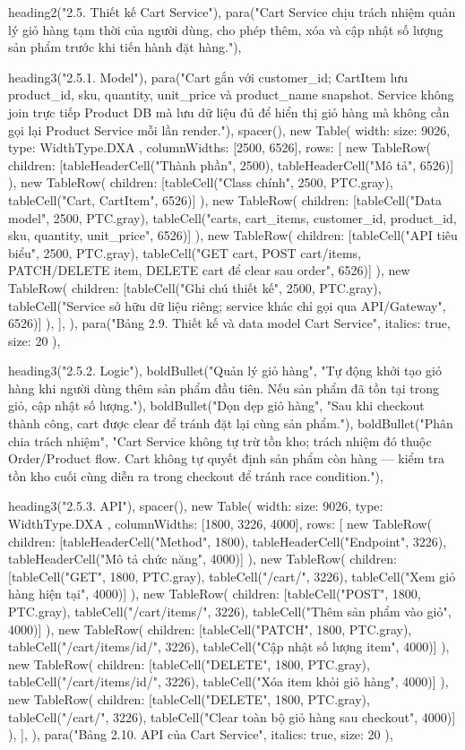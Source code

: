   heading2("2.5. Thiết kế Cart Service"),
  para("Cart Service chịu trách nhiệm quản lý giỏ hàng tạm thời của người dùng, cho phép thêm, xóa và cập nhật số lượng sản phẩm trước khi tiến hành đặt hàng."),

  heading3("2.5.1. Model"),
  para("Cart gắn với customer_id; CartItem lưu product_id, sku, quantity, unit_price và product_name snapshot. Service không join trực tiếp Product DB mà lưu dữ liệu đủ để hiển thị giỏ hàng mà không cần gọi lại Product Service mỗi lần render."),
  spacer(),
  new Table({
    width: { size: 9026, type: WidthType.DXA },
    columnWidths: [2500, 6526],
    rows: [
      new TableRow({ children: [tableHeaderCell("Thành phần", 2500), tableHeaderCell("Mô tả", 6526)] }),
      new TableRow({ children: [tableCell("Class chính", 2500, PTC.gray), tableCell("Cart, CartItem", 6526)] }),
      new TableRow({ children: [tableCell("Data model", 2500, PTC.gray), tableCell("carts, cart_items, customer_id, product_id, sku, quantity, unit_price", 6526)] }),
      new TableRow({ children: [tableCell("API tiêu biểu", 2500, PTC.gray), tableCell("GET cart, POST cart/items, PATCH/DELETE item, DELETE cart để clear sau order", 6526)] }),
      new TableRow({ children: [tableCell("Ghi chú thiết kế", 2500, PTC.gray), tableCell("Service sở hữu dữ liệu riêng; service khác chỉ gọi qua API/Gateway", 6526)] }),
    ],
  }),
  para("Bảng 2.9. Thiết kế và data model Cart Service", { italics: true, size: 20 }),

  heading3("2.5.2. Logic"),
  boldBullet("Quản lý giỏ hàng", "Tự động khởi tạo giỏ hàng khi người dùng thêm sản phẩm đầu tiên. Nếu sản phẩm đã tồn tại trong giỏ, cập nhật số lượng."),
  boldBullet("Dọn dẹp giỏ hàng", "Sau khi checkout thành công, cart được clear để tránh đặt lại cùng sản phẩm."),
  boldBullet("Phân chia trách nhiệm", "Cart Service không tự trừ tồn kho; trách nhiệm đó thuộc Order/Product flow. Cart không tự quyết định sản phẩm còn hàng — kiểm tra tồn kho cuối cùng diễn ra trong checkout để tránh race condition."),

  heading3("2.5.3. API"),
  spacer(),
  new Table({
    width: { size: 9026, type: WidthType.DXA },
    columnWidths: [1800, 3226, 4000],
    rows: [
      new TableRow({ children: [tableHeaderCell("Method", 1800), tableHeaderCell("Endpoint", 3226), tableHeaderCell("Mô tả chức năng", 4000)] }),
      new TableRow({ children: [tableCell("GET", 1800, PTC.gray), tableCell("/cart/", 3226), tableCell("Xem giỏ hàng hiện tại", 4000)] }),
      new TableRow({ children: [tableCell("POST", 1800, PTC.gray), tableCell("/cart/items/", 3226), tableCell("Thêm sản phẩm vào giỏ", 4000)] }),
      new TableRow({ children: [tableCell("PATCH", 1800, PTC.gray), tableCell("/cart/items/{id}/", 3226), tableCell("Cập nhật số lượng item", 4000)] }),
      new TableRow({ children: [tableCell("DELETE", 1800, PTC.gray), tableCell("/cart/items/{id}/", 3226), tableCell("Xóa item khỏi giỏ hàng", 4000)] }),
      new TableRow({ children: [tableCell("DELETE", 1800, PTC.gray), tableCell("/cart/", 3226), tableCell("Clear toàn bộ giỏ hàng sau checkout", 4000)] }),
    ],
  }),
  para("Bảng 2.10. API của Cart Service", { italics: true, size: 20 }),

